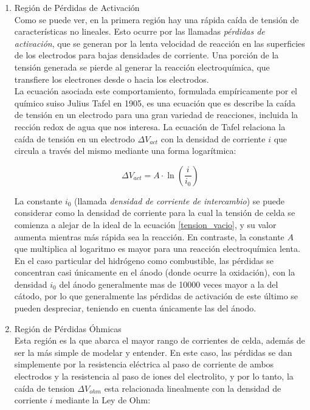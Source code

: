 \begin{enumerate}
    \SemiBold \item Región de Pérdidas de Activación\\

    \normalfont Como se puede ver, en la primera región hay una rápida caída de tensión de características no lineales. Esto ocurre por las llamadas \textit{pérdidas de activación}, que se generan por la lenta velocidad de reacción en las superficies de los electrodos para bajas densidades de corriente. Una porción de la tensión generada se pierde al generar la reacción electroquímica, que transfiere los electrones desde o hacia los electrodos.\\

    La ecuación asociada este comportamiento, formulada empíricamente por el químico suiso Julius Tafel en 1905, es una ecuación que es describe la caída de tensión en un electrodo para una gran variedad de reacciones, incluida la rección redox de agua que nos interesa. La ecuación de Tafel relaciona la caída de tensión en un electrodo $\Delta V_{act}$ con la densidad de corriente $i$ que circula a través del mismo mediante una forma logarítmica:
    
    \begin{equation}\label{perd_act}
        \Delta V_{act}=A\cdot \ln\left(\frac{i}{i_0}\right)
    \end{equation}

    La constante $i_0$ (llamada \textit{densidad de corriente de intercambio}) se puede considerar como la densidad de corriente para la cual la tensión de celda se comienza a alejar de la ideal de la ecuación \ref{tension_vacio}, y su valor aumenta mientras más rápida sea la reacción. En contraste, la constante $A$ que multiplica al logaritmo es mayor para una reacción electroquímica lenta.\\

    En el caso particular del hidrógeno como combustible, las pérdidas se concentran casi únicamente en el ánodo (donde ocurre la oxidación), con la densidad $i_0$ del ánodo generalmente mas de \num{10000} veces mayor a la del cátodo, por lo que generalmente las pérdidas de activación de este último se pueden despreciar, teniendo en cuenta únicamente las del ánodo.\\

    \SemiBold \item Región de Pérdidas Óhmicas\\

    \normalfont Esta región es la que abarca el mayor rango de corrientes de celda, además de ser la más simple de modelar y entender. En este caso, las pérdidas se dan simplemente por la resistencia eléctrica al paso de corriente de ambos electrodos y la resistencia al paso de iones del electrolito, y por lo tanto, la caída de tension $\Delta V_{ohm}$ esta relacionada linealmente con la densidad de corriente $i$ mediante la Ley de Ohm:


\end{enumerate}
